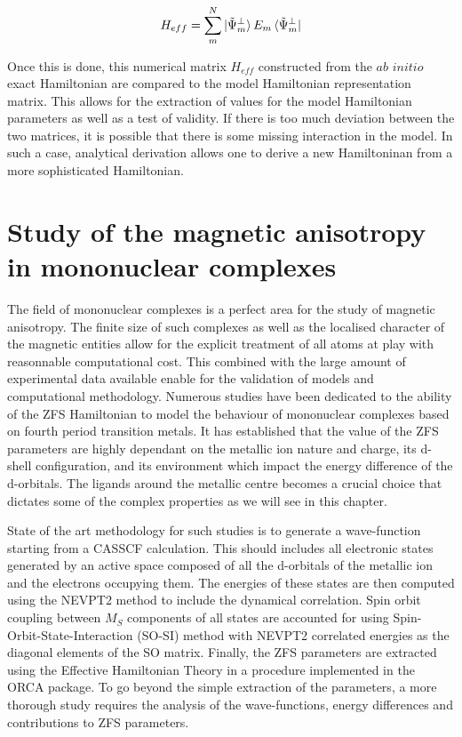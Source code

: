 \documentclass[12pt]{report}
\numberwithin{equation}{section}
\begin{document}
\begin{equation}
    H_{eff}=\sum_{m}^{N}\ket{\tilde{\Psi}_m^{\bot}}E_m \bra{\tilde{\Psi}_m^{\bot}}
\end{equation}

Once this is done, this numerical matrix $H_{eff}$ constructed from the $\textit{ab}$ $\textit{initio}$ exact Hamiltonian are compared to the model Hamiltonian representation matrix. 
This allows for the extraction of values for the model Hamiltonian parameters as well as a test of validity.
If there is too much deviation between the two matrices, it is possible that there is some missing interaction in the model.
In such a case, analytical derivation allows one to derive a new Hamiltoninan from a more sophisticated Hamiltonian.

\chapter{Study of the magnetic anisotropy in mononuclear complexes}
\label{MonoNucl}

The field of mononuclear complexes is a perfect area for the study of magnetic anisotropy. 
The finite size of such complexes as well as the localised character of the magnetic entities allow for the explicit treatment of all atoms at play with reasonnable computational cost.
This combined with the large amount of experimental data available enable for the validation of models and computational methodology.
Numerous studies have been dedicated to the ability of the ZFS Hamiltonian to model the behaviour of mononuclear complexes based on fourth period transition metals.
It has established that the value of the ZFS parameters are highly dependant on the metallic ion nature and charge, its d-shell configuration, and its environment which impact the energy difference of the d-orbitals.
The ligands around the metallic centre becomes a crucial choice that dictates some of the complex properties as we will see in this chapter.
\par State of the art methodology for such studies is to generate a wave-function starting from a CASSCF calculation. This should includes all electronic states generated by an active space composed of all the d-orbitals of the metallic ion and the electrons occupying them. 
The energies of these states are then computed using the NEVPT2 method to include the dynamical correlation.
Spin orbit coupling between $M_S$ components of all states are accounted for using Spin-Orbit-State-Interaction (SO-SI) method with NEVPT2 correlated energies as the diagonal elements of the SO matrix.
Finally, the ZFS parameters are extracted using the Effective Hamiltonian Theory in a procedure implemented in the ORCA package.
To go beyond the simple extraction of the parameters, a more thorough study requires the analysis of the wave-functions, energy differences and contributions to ZFS parameters.
\end{document}

